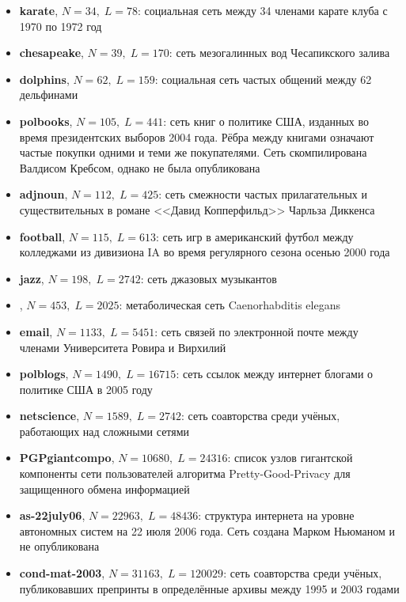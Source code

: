 \begin{itemize}
	
	\item \textbf{karate}, $N = 34,\;L = 78$: социальная сеть между 34 членами карате клуба с 1970 по 1972 год \cite{Zachary:1977}
	\item \textbf{chesapeake}, $N = 39,\;L = 170$: сеть мезогалинных вод Чесапикского залива \cite{Baird&Ulanowicz:1989}
	\item \textbf{dolphins}, $N = 62,\;L = 159$: социальная сеть частых общений между 62 дельфинами \cite{Lusseau&al:2003}
	\item \textbf{polbooks}, $N = 105,\;L = 441$: сеть книг о политике США, изданных во время президентских выборов 2004 года. Рёбра между книгами означают частые покупки одними и теми же покупателями. Сеть скомпилирована Валдисом Кребсом, однако не была опубликована
	\item \textbf{adjnoun}, $N = 112,\;L = 425$: сеть смежности частых прилагательных и существительных в романе <<Давид Копперфильд>> Чарльза Диккенса \cite{Newman:2006}
	\item \textbf{football}, $N = 115,\;L = 613$: сеть игр в американский футбол между колледжами из дивизиона IA во время регулярного сезона осенью 2000 года \cite{Girvan&Newman:2002}
	\item \textbf{jazz}, $N = 198,\;L = 2742$: сеть джазовых музыкантов \cite{Gleiser&Danon:2003}
	\item \textbf{\celegans}, $N = 453,\;L = 2025$: метаболическая сеть Caenorhabditis elegans \cite{Duch&Arenas:2005}
	\item \textbf{email}, $N = 1133,\;L = 5451$: сеть связей по электронной почте между членами Университета Ровира и Вирхилий \cite{Guimera&al:2003}
	\item \textbf{polblogs}, $N = 1490,\;L = 16715$: сеть ссылок между интернет блогами о политике США в 2005 году \cite{Adamic&Glance:2005}
	\item \textbf{netscience}, $N = 1589,\;L = 2742$: сеть соавторства среди учёных, работающих над сложными сетями \cite{Newman:2006}
	\item \textbf{PGPgiantcompo}, $N = 10680,\;L = 24316$: список узлов гигантской компоненты сети пользователей алгоритма Pretty-Good-Privacy для защищенного обмена информацией \cite{Boguna&al:2004}
	\item \textbf{as-22july06}, $N = 22963,\;L = 48436$: структура интернета на уровне автономных систем на 22 июля 2006 года. Сеть создана Марком Ньюманом и не опубликована
	\item \textbf{cond-mat-2003}, $N = 31163,\;L = 120029$: сеть соавторства среди учёных, публиковавших препринты в определённые архивы между 1995 и 2003 годами \cite{Newman:2001}

\end{itemize}
